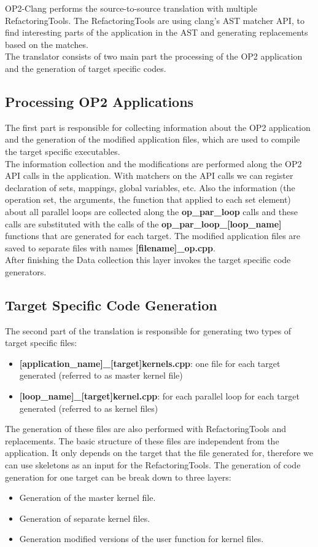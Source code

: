 OP2-Clang performs the source-to-source translation with multiple RefactoringTools. The RefactoringTools are using clang's AST matcher API, to find interesting parts of the application in the AST and generating replacements based on the matches.\\
The translator consists of two main part the processing of the OP2 application and the generation of target specific codes.

\subsection{Processing OP2 Applications}
The  first part is responsible for collecting information about the OP2 application and the generation of the modified application files, which are used to compile the target specific executables.\\
The information collection and the modifications are performed along the OP2 API calls in the application. With matchers on the API calls we can register declaration of sets, mappings, global variables, etc. Also the information (the operation set, the arguments, the function that applied to each set element) about all parallel loops are collected along the \textbf{op\_par\_loop} calls and these calls are substituted with the calls of the \textbf{op\_par\_loop\_[loop\_name]} functions that are generated for each target. The modified application files are saved to separate files with names \textbf{[filename]\_op.cpp}.\\
After finishing the Data collection this layer invokes the target specific code generators.

\subsection{Target Specific Code Generation}

The second part of the translation is responsible for generating two types of target specific files:
\begin{itemize}
    \item \textbf{[application\_name]\_[target]kernels.cpp}: one file for each target generated (referred to as master kernel file)
    \item \textbf{[loop\_name]\_[target]kernel.cpp}: for each parallel loop for each target generated (referred to as kernel files)
\end{itemize}
The generation of these files are also performed with RefactoringTools and replacements. The basic structure of these files are independent from the application. It only depends on the target that the file generated for, therefore we can use skeletons as an input for the RefactoringTools. The generation of code generation for one target can be break down to three layers:
\begin{itemize}
    \item Generation of the master kernel file.
    \item Generation of separate kernel files.
    \item Generation modified versions of the user function for kernel files.
\end{itemize}

